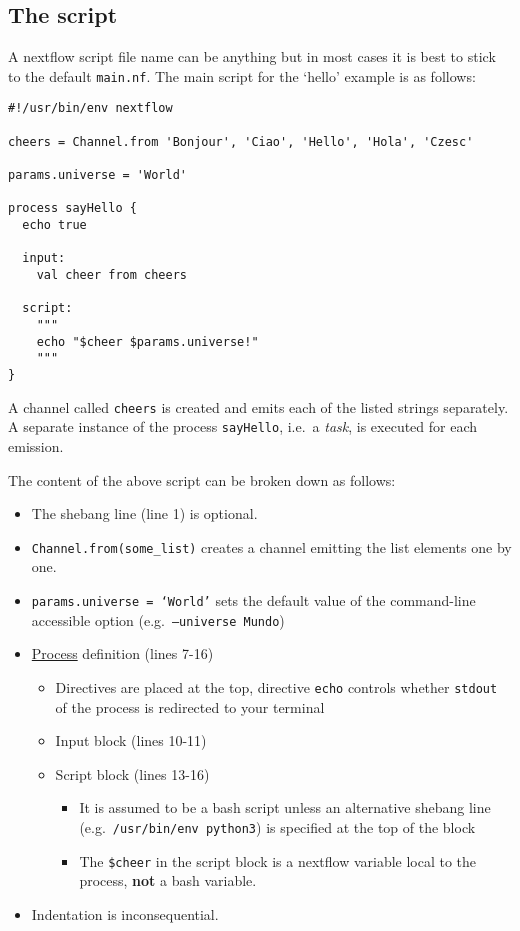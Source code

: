 \subsection{The script}

A nextflow script file name can be anything but in most cases it is best to stick to the default \texttt{main.nf}. 
The main script for the `hello' example is as follows:


\begin{lstlisting}
#!/usr/bin/env nextflow

cheers = Channel.from 'Bonjour', 'Ciao', 'Hello', 'Hola', 'Czesc'

params.universe = 'World'

process sayHello {
  echo true

  input:
    val cheer from cheers
    
  script:
    """
    echo "$cheer $params.universe!"
    """
}
\end{lstlisting}


A channel called \texttt{cheers} is created and emits each of the listed strings separately. 
A separate instance of the process \texttt{sayHello}, i.e.\ a \emph{task}, is executed for each emission. 

\begin{note}
The content of the above script can be broken down as follows:
\begin{itemize}
  \item The shebang line (line 1) is optional.
  \item \texttt{Channel.from(some\_list)} creates a channel emitting the list elements one by one.
  \item \texttt{params.universe = `World'} sets the default value of the command-line accessible option (e.g.\ \texttt{--universe Mundo})
  \item \href{https://www.nextflow.io/docs/latest/process.html}{Process} definition (lines 7-16)
  \begin{itemize}
    \item Directives are placed at the top, directive \texttt{echo} controls whether \texttt{stdout} of the process is redirected to your terminal
    \item Input block (lines 10-11) 
    \item Script block (lines 13-16)
    \begin{itemize}
     \item It is assumed to be a bash script unless an alternative shebang line (e.g.\  \texttt{/usr/bin/env python3}) is specified at the top of the block 
     \item The \texttt{\$cheer} in the script block is a nextflow variable local to the process, \textbf{not} a bash variable.
    \end{itemize}
  \end{itemize}
  
  \item Indentation is inconsequential. 
\end{itemize}

\end{note}


